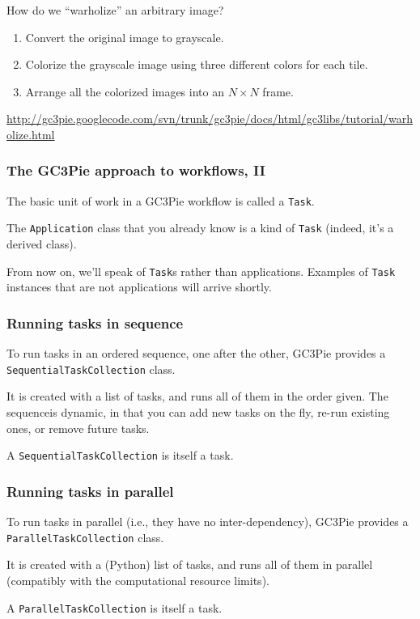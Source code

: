\documentclass[english,serif,mathserif,xcolor=pdftex,dvipsnames,table]{beamer}
\begin{document}
\begin{frame}
How do we ``warholize'' an arbitrary image?  

\+
\begin{enumerate}
\item Convert the original image to grayscale.
\item Colorize the grayscale image using three different colors for each tile.
\item Arrange all the colorized images into an $N\times N$ frame.
\end{enumerate}

\+
\begin{references}
  \url{http://gc3pie.googlecode.com/svn/trunk/gc3pie/docs/html/gc3libs/tutorial/warholize.html}
\end{references}
\end{frame}


\begin{frame}
  \frametitle{The GC3Pie approach to workflows, II}
  
  The basic unit of work in a GC3Pie workflow is called a \texttt{Task}.

  \+ 
  The \texttt{Application} class that you already know is a kind of
  \texttt{Task} (indeed, it's a derived class).

  \+ 
  From now on, we'll speak of \texttt{Task}s rather than
  applications.  Examples of \texttt{Task} instances that are not
  applications will arrive shortly.
\end{frame}


\begin{frame}
  \frametitle{Running tasks in sequence}

  To run tasks in an ordered sequence, one after the other, GC3Pie
  provides a \texttt{SequentialTaskCollection} class.

  \+ 
  It is created with a list of tasks, and runs all of them in the
  order given.  The sequenceis dynamic, in that you can add new tasks
  on the fly, re-run existing ones, or remove future tasks.

  \+
  A \texttt{SequentialTaskCollection} is itself a task.
\end{frame}


\begin{frame}
  \frametitle{Running tasks in parallel}

  To run tasks in parallel (i.e., they have no inter-dependency),
  GC3Pie provides a \texttt{ParallelTaskCollection} class.

  \+ 
  It is created with a (Python) list of tasks, and runs all of them
  in parallel (compatibly with the computational resource limits).

  \+
  A \texttt{ParallelTaskCollection} is itself a task.

\end{frame}
\end{document}
